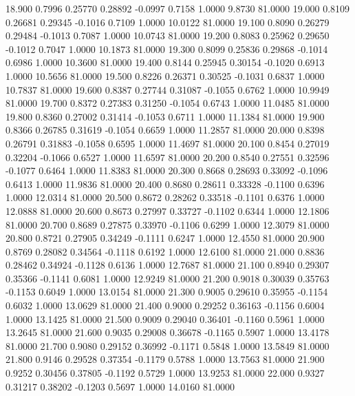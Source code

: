   18.900   0.7996   0.25770   0.28892  -0.0997   0.7158   1.0000   9.8730  81.0000
  19.000   0.8109   0.26681   0.29345  -0.1016   0.7109   1.0000  10.0122  81.0000
  19.100   0.8090   0.26279   0.29484  -0.1013   0.7087   1.0000  10.0743  81.0000
  19.200   0.8083   0.25962   0.29650  -0.1012   0.7047   1.0000  10.1873  81.0000
  19.300   0.8099   0.25836   0.29868  -0.1014   0.6986   1.0000  10.3600  81.0000
  19.400   0.8144   0.25945   0.30154  -0.1020   0.6913   1.0000  10.5656  81.0000
  19.500   0.8226   0.26371   0.30525  -0.1031   0.6837   1.0000  10.7837  81.0000
  19.600   0.8387   0.27744   0.31087  -0.1055   0.6762   1.0000  10.9949  81.0000
  19.700   0.8372   0.27383   0.31250  -0.1054   0.6743   1.0000  11.0485  81.0000
  19.800   0.8360   0.27002   0.31414  -0.1053   0.6711   1.0000  11.1384  81.0000
  19.900   0.8366   0.26785   0.31619  -0.1054   0.6659   1.0000  11.2857  81.0000
  20.000   0.8398   0.26791   0.31883  -0.1058   0.6595   1.0000  11.4697  81.0000
  20.100   0.8454   0.27019   0.32204  -0.1066   0.6527   1.0000  11.6597  81.0000
  20.200   0.8540   0.27551   0.32596  -0.1077   0.6464   1.0000  11.8383  81.0000
  20.300   0.8668   0.28693   0.33092  -0.1096   0.6413   1.0000  11.9836  81.0000
  20.400   0.8680   0.28611   0.33328  -0.1100   0.6396   1.0000  12.0314  81.0000
  20.500   0.8672   0.28262   0.33518  -0.1101   0.6376   1.0000  12.0888  81.0000
  20.600   0.8673   0.27997   0.33727  -0.1102   0.6344   1.0000  12.1806  81.0000
  20.700   0.8689   0.27875   0.33970  -0.1106   0.6299   1.0000  12.3079  81.0000
  20.800   0.8721   0.27905   0.34249  -0.1111   0.6247   1.0000  12.4550  81.0000
  20.900   0.8769   0.28082   0.34564  -0.1118   0.6192   1.0000  12.6100  81.0000
  21.000   0.8836   0.28462   0.34924  -0.1128   0.6136   1.0000  12.7687  81.0000
  21.100   0.8940   0.29307   0.35366  -0.1141   0.6081   1.0000  12.9249  81.0000
  21.200   0.9018   0.30039   0.35763  -0.1153   0.6049   1.0000  13.0154  81.0000
  21.300   0.9005   0.29610   0.35955  -0.1154   0.6032   1.0000  13.0629  81.0000
  21.400   0.9000   0.29252   0.36163  -0.1156   0.6004   1.0000  13.1425  81.0000
  21.500   0.9009   0.29040   0.36401  -0.1160   0.5961   1.0000  13.2645  81.0000
  21.600   0.9035   0.29008   0.36678  -0.1165   0.5907   1.0000  13.4178  81.0000
  21.700   0.9080   0.29152   0.36992  -0.1171   0.5848   1.0000  13.5849  81.0000
  21.800   0.9146   0.29528   0.37354  -0.1179   0.5788   1.0000  13.7563  81.0000
  21.900   0.9252   0.30456   0.37805  -0.1192   0.5729   1.0000  13.9253  81.0000
  22.000   0.9327   0.31217   0.38202  -0.1203   0.5697   1.0000  14.0160  81.0000
